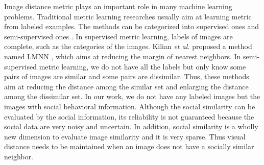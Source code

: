 Image distance metric plays an important role in many machine learning problems. Traditional metric learning researches usually aim at learning metric from labeled examples. The methods can be categorized into supervised ones \cite{super_metric1} and semi-supervised ones \cite{semi_super_metric}. In supervised metric learning, labels of images are complete, such as the categories of the images. Kilian \emph{et al.} proposed a method named LMNN \cite{lmnn}, which aims at reducing the margin of nearest neighbors. In semi-supervised metric learning, we do not have all the labels but only know some pairs of images are similar and some pairs are dissimilar. Thus, these methods aim at reducing the distance among the similar set and enlarging the distance among the dissimilar set. In our work, we do not have any labeled images but the images with social behavioral information. Although the social similarity can be evaluated by the social information, its reliability is not guaranteed because the social data are very noisy and uncertain. In addition, social similarity is a wholly new dimension to evaluate image similarity and it is very sparse. Thus visual distance needs to be maintained when an image does not have a socially similar neighbor.



